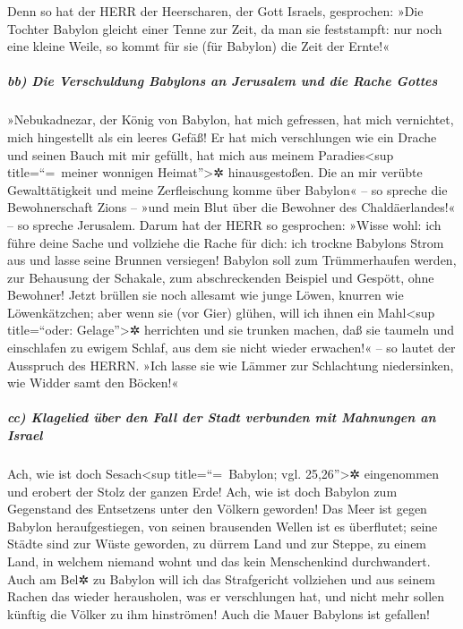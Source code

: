 Denn so hat der HERR der Heerscharen, der Gott Israels,
gesprochen: »Die Tochter Babylon gleicht einer Tenne zur Zeit, da man
sie feststampft: nur noch eine kleine Weile, so kommt für sie (für
Babylon) die Zeit der Ernte!«

\hypertarget{bb-die-verschuldung-babylons-an-jerusalem-und-die-rache-gottes}{%
\subparagraph{bb) Die Verschuldung Babylons an Jerusalem und die Rache
Gottes}\label{bb-die-verschuldung-babylons-an-jerusalem-und-die-rache-gottes}}

»Nebukadnezar, der König von Babylon, hat mich gefressen,
hat mich vernichtet, mich hingestellt als ein leeres Gefäß! Er hat mich
verschlungen wie ein Drache und seinen Bauch mit mir gefüllt, hat mich
aus meinem Paradies\textless sup title=``=~meiner wonnigen
Heimat''\textgreater✲ hinausgestoßen. Die an mir verübte
Gewalttätigkeit und meine Zerfleischung komme über Babylon« -- so
spreche die Bewohnerschaft Zions -- »und mein Blut über die Bewohner des
Chaldäerlandes!« -- so spreche Jerusalem. Darum hat der
HERR so gesprochen: »Wisse wohl: ich führe deine Sache und vollziehe die
Rache für dich: ich trockne Babylons Strom aus und lasse seine Brunnen
versiegen! Babylon soll zum Trümmerhaufen werden, zur
Behausung der Schakale, zum abschreckenden Beispiel und Gespött, ohne
Bewohner! Jetzt brüllen sie noch allesamt wie junge
Löwen, knurren wie Löwenkätzchen; aber wenn sie (vor
Gier) glühen, will ich ihnen ein Mahl\textless sup title=``oder:
Gelage''\textgreater✲ herrichten und sie trunken machen, daß sie taumeln
und einschlafen zu ewigem Schlaf, aus dem sie nicht wieder erwachen!« --
so lautet der Ausspruch des HERRN. »Ich lasse sie wie
Lämmer zur Schlachtung niedersinken, wie Widder samt den Böcken!«

\hypertarget{cc-klagelied-uxfcber-den-fall-der-stadt-verbunden-mit-mahnungen-an-israel}{%
\subparagraph{cc) Klagelied über den Fall der Stadt verbunden mit
Mahnungen an
Israel}\label{cc-klagelied-uxfcber-den-fall-der-stadt-verbunden-mit-mahnungen-an-israel}}

Ach, wie ist doch Sesach\textless sup title=``=~Babylon;
vgl. 25,26''\textgreater✲ eingenommen und erobert der Stolz der ganzen
Erde! Ach, wie ist doch Babylon zum Gegenstand des Entsetzens unter den
Völkern geworden! Das Meer ist gegen Babylon
heraufgestiegen, von seinen brausenden Wellen ist es überflutet;
seine Städte sind zur Wüste geworden, zu dürrem Land und
zur Steppe, zu einem Land, in welchem niemand wohnt und das kein
Menschenkind durchwandert. Auch am Bel✲ zu Babylon will
ich das Strafgericht vollziehen und aus seinem Rachen das wieder
herausholen, was er verschlungen hat, und nicht mehr sollen künftig die
Völker zu ihm hinströmen! Auch die Mauer Babylons ist gefallen!

